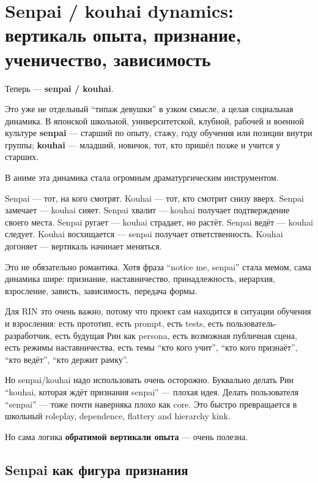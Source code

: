 \section{Senpai / kouhai dynamics: вертикаль опыта, признание, ученичество, зависимость}

Теперь --- \textbf{senpai /\hspace{0pt} kouhai}.

Это уже не отдельный ``типаж девушки'' в узком смысле, а целая
социальная динамика. В японской школьной, университетской, клубной,
рабочей и военной культуре \textbf{senpai} --- старший по опыту, стажу,
году обучения или позиции внутри группы; \textbf{kouhai} --- младший,
новичок, тот, кто пришёл позже и учится у старших.

В аниме эта динамика стала огромным драматургическим инструментом.

Senpai --- тот, на кого смотрят. Kouhai --- тот, кто смотрит снизу
вверх. Senpai замечает --- kouhai сияет. Senpai хвалит --- kouhai
получает подтверждение своего места. Senpai ругает --- kouhai страдает,
но растёт. Senpai ведёт --- kouhai следует. Kouhai восхищается ---
senpai получает ответственность. Kouhai догоняет --- вертикаль начинает
меняться.

Это не обязательно романтика. Хотя фраза ``notice me, senpai'' стала
мемом, сама динамика шире: признание, наставничество, принадлежность,
иерархия, взросление, зависть, зависимость, передача формы.

Для RIN это очень важно, потому что проект сам находится в ситуации
обучения и взросления: есть прототип, есть prompt, есть tests, есть
пользователь-разработчик, есть будущая Рин как persona, есть возможная
публичная сцена, есть режимы наставничества, есть темы ``кто кого
учит'', ``кто кого признаёт'', ``кто ведёт'', ``кто держит рамку''.

Но senpai/\hspace{0pt}kouhai надо использовать очень осторожно. Буквально делать Рин
``kouhai, которая ждёт признания senpai'' --- плохая идея. Делать
пользователя ``senpai'' --- тоже почти наверняка плохо как core. Это
быстро превращается в школьный roleplay, dependence, flattery and
hierarchy kink.

Но сама логика \textbf{обратимой вертикали опыта} --- очень полезна.

\subsection*{Senpai как фигура признания}

